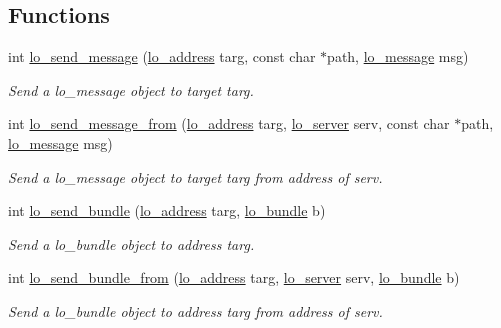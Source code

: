 \subsection*{\-Functions}
\begin{DoxyCompactItemize}
\item 
int \hyperlink{group__liblolowlevel_ga175a13c6d81adf5c346cdca9bbdcf225}{lo\-\_\-send\-\_\-message} (\hyperlink{lo__types_8h_abf9b53223467de596b89e1377b0f3f3d}{lo\-\_\-address} targ, const char $\ast$path, \hyperlink{lo__types_8h_ad126083c98d941f00eb72d1690b38d63}{lo\-\_\-message} msg)
\begin{DoxyCompactList}\small\item\em \-Send a lo\-\_\-message object to target targ. \end{DoxyCompactList}\item 
int \hyperlink{group__liblolowlevel_ga9d1aa7c1ee1ce60fe0cf7e3f1e5a6822}{lo\-\_\-send\-\_\-message\-\_\-from} (\hyperlink{lo__types_8h_abf9b53223467de596b89e1377b0f3f3d}{lo\-\_\-address} targ, \hyperlink{lo__types_8h_a59067bf50cf8abb4371da6f03c9036c9}{lo\-\_\-server} serv, const char $\ast$path, \hyperlink{lo__types_8h_ad126083c98d941f00eb72d1690b38d63}{lo\-\_\-message} msg)
\begin{DoxyCompactList}\small\item\em \-Send a lo\-\_\-message object to target targ from address of serv. \end{DoxyCompactList}\item 
int \hyperlink{group__liblolowlevel_gad1138d0f777693ae0321e3da65aee53e}{lo\-\_\-send\-\_\-bundle} (\hyperlink{lo__types_8h_abf9b53223467de596b89e1377b0f3f3d}{lo\-\_\-address} targ, \hyperlink{lo__types_8h_a96254950ad34e9cfbf8a6613fc74025b}{lo\-\_\-bundle} b)
\begin{DoxyCompactList}\small\item\em \-Send a lo\-\_\-bundle object to address targ. \end{DoxyCompactList}\item 
int \hyperlink{group__liblolowlevel_gab5de220b7d6d7c2bf6b0ca4316a54b7a}{lo\-\_\-send\-\_\-bundle\-\_\-from} (\hyperlink{lo__types_8h_abf9b53223467de596b89e1377b0f3f3d}{lo\-\_\-address} targ, \hyperlink{lo__types_8h_a59067bf50cf8abb4371da6f03c9036c9}{lo\-\_\-server} serv, \hyperlink{lo__types_8h_a96254950ad34e9cfbf8a6613fc74025b}{lo\-\_\-bundle} b)
\begin{DoxyCompactList}\small\item\em \-Send a lo\-\_\-bundle object to address targ from address of serv. \end{DoxyCompactList}\item 

\end{DoxyCompactItemize}
